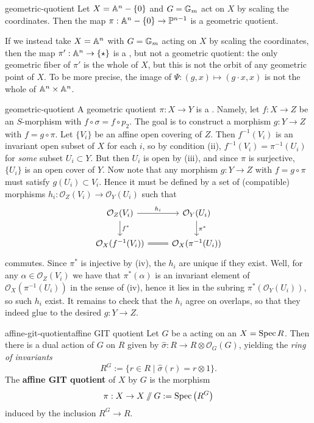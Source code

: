 \begin{example}{geometric-quotient}
    Let $X = \AA^n - \{ 0 \}$ and $G = \GG_m$ act on $X$ by scaling the coordinates. Then the map $\pi : \AA^n - \{ 0 \} \to \PP^{n - 1}$ is a geometric quotient.
    
    If we instead take $X = \AA^n$ with $G = \GG_m$ acting on $X$ by scaling the coordinates, then the map $\pi' : \AA^n \to \{ \star \}$ is a , but not a geometric quotient: the only geometric fiber of $\pi'$ is the whole of $X$, but this is not the orbit of any geometric point of $X$. To be more precise, the image of $\Psi : (g, x) \mapsto (g \cdot x, x)$ is not the whole of $\AA^n \times \AA^n$.
\end{example}

\begin{example}{geometric-quotient}
    A geometric quotient $\pi : X \to Y$ is a . Namely, let $f : X \to Z$ be an $S$-morphism with $f \circ \sigma = f \circ p_2$. The goal is to construct a morphism $g : Y \to Z$ with $f = g \circ \pi$. Let $\{ V_i \}$ be an affine open covering of $Z$. Then $f^{-1}(V_i)$ is an invariant open subset of $X$ for each $i$, so by condition (ii), $f^{-1}(V_i) = \pi^{-1}(U_i)$ for \textit{some} subset $U_i \subset Y$. But then $U_i$ is open by (iii), and since $\pi$ is surjective, $\{ U_i \}$ is an open cover of $Y$. Now note that any morphism $g : Y \to Z$ with $f = g \circ \pi$ must satisfy $g(U_i) \subset V_i$. Hence it must be defined by a set of (compatible) morphisms $h_i : \mathcal{O}_Z(V_i) \to \mathcal{O}_Y(U_i)$ such that
    \[ \begin{tikzcd} \mathcal{O}_Z(V_i) \arrow{r}{h_i} \arrow{d}{f^*} & \mathcal{O}_Y(U_i) \arrow{d}{\pi^*} \\ \mathcal{O}_X(f^{-1}(V_i)) \arrow[equal]{r} & \mathcal{O}_X(\pi^{-1}(U_i)) \end{tikzcd} \]
    commutes. Since $\pi^*$ is injective by (iv), the $h_i$ are unique if they exist. Well, for any $\alpha \in \mathcal{O}_Z(V_i)$ we have that $\pi^*(\alpha)$ is an invariant element of $\mathcal{O}_X(\pi^{-1}(U_i))$ in the sense of (iv), hence it lies in the subring $\pi^*(\mathcal{O}_Y(U_i))$, so such $h_i$ exist.
    It remains to check that the $h_i$ agree on overlaps, so that they indeed glue to the desired $g : Y \to Z$.
\end{example}

\begin{topic}{affine-git-quotient}{affine GIT quotient}
    Let $G$ be a   acting on an  $X = \Spec R$. Then there is a dual action of $G$ on $R$ given by $\widehat{\sigma} : R \to R \otimes \mathcal{O}_G(G)$, yielding the \textit{ring of invariants}
    \[ R^G := \{ r \in R \mid \widehat{\sigma}(r) = r \otimes 1 \} . \]
    The \textbf{affine GIT quotient} of $X$ by $G$ is the morphism
    \[ \pi : X \to X \sslash G := \Spec\left(R^G\right) \]
    induced by the inclusion $R^G \to R$.
\end{topic}

